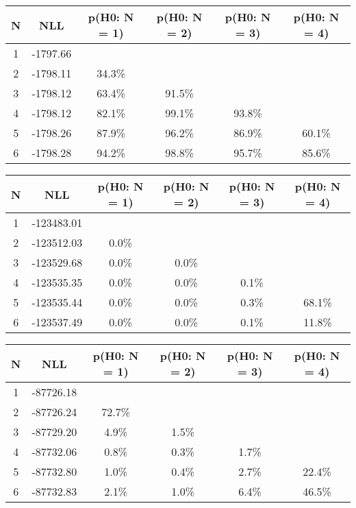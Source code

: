 \begin{table}[htb]
	\begin{center}
{\footnotesize\renewcommand{\arraystretch}{1.4}
		\begin{tabular}{cc||cccc}
			N & NLL & p(H0: N = 1) & p(H0: N = 2) & p(H0: N = 3) & p(H0: N = 4)\\ 
		\hline
1 & -1797.66 & & & & \\
2 & -1798.11 & 34.3\% & & & \\
3 & -1798.12 & 63.4\% & 91.5\% & & \\
4 & -1798.12 & 82.1\% & 99.1\% & 93.8\% & \\
5 & -1798.26 & 87.9\% & 96.2\% & 86.9\% & 60.1\% \\
6 & -1798.28 & 94.2\% & 98.8\% & 95.7\% & 85.6\% \\
	\end{tabular}
		\label{tab:lab}
	}
	\end{center}\end{table}

\begin{table}[htb]
	\begin{center}
{\footnotesize\renewcommand{\arraystretch}{1.4}
		\begin{tabular}{cc||cccc}
			N & NLL & p(H0: N = 1) & p(H0: N = 2) & p(H0: N = 3) & p(H0: N = 4)\\ 
		\hline
1 & -123483.01 & & & & \\
2 & -123512.03 & 0.0\% & & & \\
3 & -123529.68 & 0.0\% & 0.0\% & & \\
4 & -123535.35 & 0.0\% & 0.0\% & 0.1\% & \\
5 & -123535.44 & 0.0\% & 0.0\% & 0.3\% & 68.1\% \\
6 & -123537.49 & 0.0\% & 0.0\% & 0.1\% & 11.8\% \\
	\end{tabular}
		\label{tab:lab}
	}
	\end{center}\end{table}

\begin{table}[htb]
	\begin{center}
{\footnotesize\renewcommand{\arraystretch}{1.4}
		\begin{tabular}{cc||cccc}
			N & NLL & p(H0: N = 1) & p(H0: N = 2) & p(H0: N = 3) & p(H0: N = 4)\\ 
		\hline
1 & -87726.18 & & & & \\
2 & -87726.24 & 72.7\% & & & \\
3 & -87729.20 & 4.9\% & 1.5\% & & \\
4 & -87732.06 & 0.8\% & 0.3\% & 1.7\% & \\
5 & -87732.80 & 1.0\% & 0.4\% & 2.7\% & 22.4\% \\
6 & -87732.83 & 2.1\% & 1.0\% & 6.4\% & 46.5\% \\
	\end{tabular}
		\label{tab:lab}
	}
	\end{center}\end{table}

